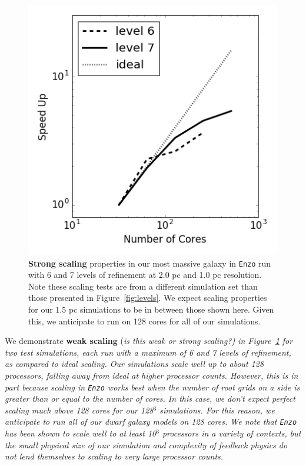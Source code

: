 \documentclass[11pt]{article}
\begin{document}
\begin{figure}
\centering
\includegraphics[width=0.32\linewidth]{enzo_scaling}

\caption{\small \textbf{Strong scaling} properties in our most massive galaxy in \texttt{Enzo} run with 6 and 7 levels of refinement at 2.0 pc and 1.0 pc resolution. Note these scaling tests are from a different simulation set than those presented in Figure~\ref{fig:levels}. We expect scaling properties for our 1.5 pc simulations to be in between those shown here. Given this, we anticipate to run on 128 cores for all of our simulations.}
\label{fig:radiation_and_scaling}
\end{figure}

We demonstrate \textbf{weak scaling} (\it{is this weak or strong scaling?}) in Figure~\ref{fig:radiation_and_scaling} for two test simulations, each run with a maximum of 6 and 7 levels of refinement, as compared to ideal scaling. Our simulations scale well up to about 128 processors, falling away from ideal at higher processor counts. However, this is in part because scaling in \texttt{Enzo} works best when the number of root grids on a side is greater than or equal to the number of cores. In this case, we don't expect perfect scaling much above 128 cores for our 128$^3$ simulations. For this reason, we anticipate to run all of our dwarf galaxy models on 128 cores. We note that \texttt{Enzo} has been shown to scale well to at least 10$^3$ processors in a variety of contexts, but the small physical size of our simulation and complexity of feedback physics do not lend themselves to scaling to very large processor counts.

\clearpage


\end{document}
